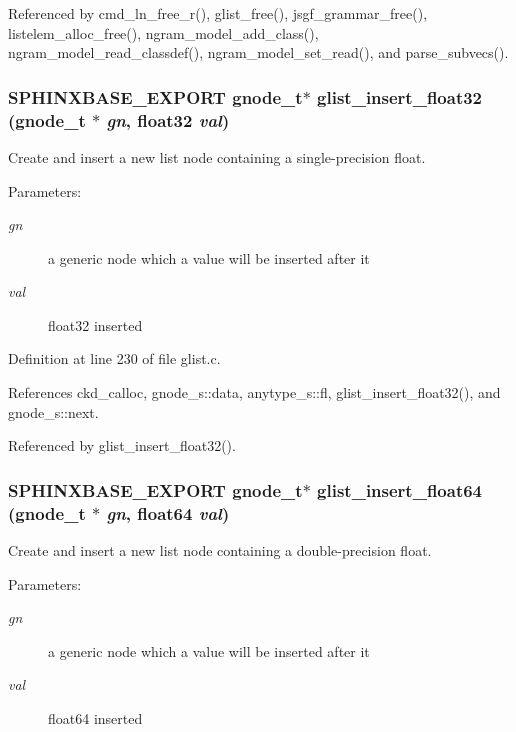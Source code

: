Referenced by cmd\_\-ln\_\-free\_\-r(), glist\_\-free(), jsgf\_\-grammar\_\-free(), listelem\_\-alloc\_\-free(), ngram\_\-model\_\-add\_\-class(), ngram\_\-model\_\-read\_\-classdef(), ngram\_\-model\_\-set\_\-read(), and parse\_\-subvecs().
\subsubsection[{glist\_\-insert\_\-float32}]{\setlength{\rightskip}{0pt plus 5cm}SPHINXBASE\_\-EXPORT {\bf gnode\_\-t}$\ast$ glist\_\-insert\_\-float32 ({\bf gnode\_\-t} $\ast$ {\em gn}, \/  float32 {\em val})}\label{glist_8h_ff08aed022168872fc9d30cd299df2ce}


Create and insert a new list node containing a single-precision float. 

\begin{Desc}
\item[Parameters: ]\par
\begin{description}
\item[{\em 
gn}]a generic node which a value will be inserted after it \item[{\em 
val}]float32 inserted \end{description}
\end{Desc}


Definition at line 230 of file glist.c.

References ckd\_\-calloc, gnode\_\-s::data, anytype\_\-s::fl, glist\_\-insert\_\-float32(), and gnode\_\-s::next.

Referenced by glist\_\-insert\_\-float32().
\subsubsection[{glist\_\-insert\_\-float64}]{\setlength{\rightskip}{0pt plus 5cm}SPHINXBASE\_\-EXPORT {\bf gnode\_\-t}$\ast$ glist\_\-insert\_\-float64 ({\bf gnode\_\-t} $\ast$ {\em gn}, \/  float64 {\em val})}\label{glist_8h_97a682e38319dd8f67765732467110f9}


Create and insert a new list node containing a double-precision float. 

\begin{Desc}
\item[Parameters: ]\par
\begin{description}
\item[{\em 
gn}]a generic node which a value will be inserted after it \item[{\em 
val}]float64 inserted \end{description}
\end{Desc}


